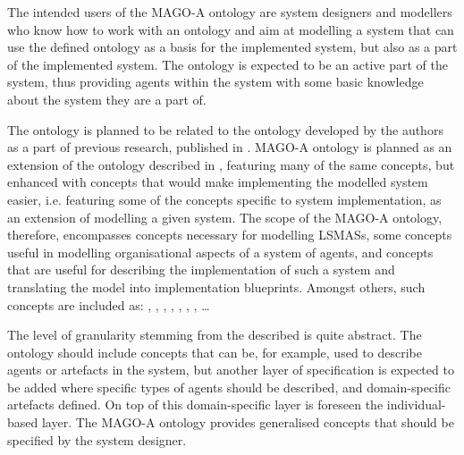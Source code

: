 The intended users%
%
of the MAGO-A ontology are system designers and modellers who know how to work with an ontology and aim at modelling a system that can use the defined ontology as a basis for the implemented system, but also as a part of the implemented system. The ontology is expected to be an active part of the system, thus providing agents within the system with some basic knowledge about the system they are a part of. 

The ontology is planned to be related to the ontology developed by the authors as a part of previous research, published in \cite{okresaduric2019MAMbO5NewOntology}. MAGO-A ontology is planned as an extension of the ontology described in \cite{okresaduric2019MAMbO5NewOntology},
%
featuring many of the same concepts, but enhanced with concepts that would make implementing the modelled system easier, i.e. featuring some of the concepts specific to system implementation, as an extension of modelling a given system. The scope of the MAGO-A ontology, therefore, encompasses concepts necessary for modelling \acp{LSMAS}, some concepts useful in modelling organisational aspects of a system of agents, and concepts that are useful for describing the implementation of such a system and translating the model into implementation blueprints. Amongst others, such concepts are included as: , , , , , , , \ldots

The level of granularity
%
stemming from the described is quite abstract. The ontology should include concepts that can be, for example, used to describe agents or artefacts in the system, but another layer of specification is expected to be added where specific types of agents should be described, and domain-specific artefacts defined. On top of this domain-specific layer is foreseen the individual-based layer. The MAGO-A ontology provides generalised concepts that should be specified by the system designer. 
